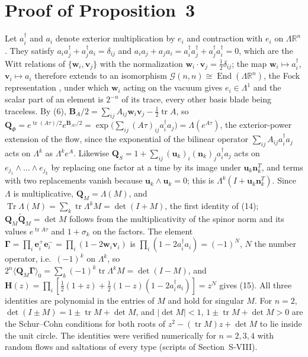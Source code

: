 \documentclass[journal]{IEEEtran}
\newcommand{\Gnn}{\mathcal{G}(n,n)}
\newcommand{\rev}[1]{\widetilde{#1}}
\begin{document}
\section{Proof of Proposition~3}
Let $a_i^{\dagger}$ and $a_i$ denote exterior multiplication by $e_i$ and
contraction with $e_i$ on $\Lambda\mathbb{R}^{n}$. They satisfy
$a_ia_j^{\dagger}+a_j^{\dagger}a_i=\delta_{ij}$ and
$a_ia_j+a_ja_i=a_i^{\dagger}a_j^{\dagger}+a_j^{\dagger}a_i^{\dagger}=0$, which
are the Witt relations of $\{\bm{w}_i,\bm{v}_j\}$ with the normalization
$\bm{w}_i\!\cdot\!\bm{v}_j=\tfrac12\delta_{ij}$; the map
$\bm{w}_i\mapsto a_i^{\dagger}$, $\bm{v}_i\mapsto a_i$ therefore extends to
an isomorphism $\Gnn\cong\operatorname{End}(\Lambda\mathbb{R}^{n})$, the Fock
representation \cite{lounesto2001}, under which $\bm{w}_i$ acting on the
vacuum gives $e_i\in\Lambda^{1}$ and the scalar part of an element is
$2^{-n}$ of its trace, every other basis blade being traceless. By (6),
$\bm{B}_A/2=\sum_{ij}A_{ij}\bm{w}_i\bm{v}_j-\tfrac12\operatorname{tr}A$, so
$\bm{Q}_{\Phi}=e^{\operatorname{tr}(A\tau)/2}e^{\bm{B}_{A\tau}/2}
=\exp\bigl(\sum_{ij}(A\tau)_{ij}a_i^{\dagger}a_j\bigr)=\Lambda(e^{A\tau})$,
the exterior-power extension of the flow, since the exponential of the
bilinear operator $\sum_{ij}A_{ij}a_i^{\dagger}a_j$ acts on $\Lambda^{k}$ as
$\Lambda^{k}e^{A}$. Likewise
$\bm{Q}_S=1+\sum_{ij}(\bm{u}_k)_i(\bm{n}_k)_j a_i^{\dagger}a_j$ acts on
$e_{j_1}\wedge\dots\wedge e_{j_k}$ by replacing one factor at a time by its
image under $\bm{u}_k\bm{n}_k^{T}$, and terms with two replacements vanish
because $\bm{u}_k\wedge\bm{u}_k=0$; this is $\Lambda^{k}(I+\bm{u}_k\bm{n}_k^{T})$.
Since $\Lambda$ is multiplicative, $\bm{Q}_M=\Lambda(M)$, and
$\operatorname{Tr}\Lambda(M)=\sum_k\operatorname{tr}\Lambda^{k}M=\det(I+M)$, the first identity of (14);
$\bm{Q}_M\rev{\bm{Q}}_M=\det M$ follows from the multiplicativity of the
spinor norm and its values $e^{\operatorname{tr}A\tau}$ and $1+\sigma_k$ on
the factors. The element
$\bm{\Gamma}=\prod_i\bm{e}^{+}_i\bm{e}^{-}_i=\prod_i(1-2\bm{w}_i\bm{v}_i)$ is
$\prod_i(1-2a_i^{\dagger}a_i)=(-1)^{N}$, $N$ the number operator, i.e.\
$(-1)^{k}$ on $\Lambda^{k}$, so
$2^{n}\langle\bm{Q}_M\bm{\Gamma}\rangle_0=\sum_k(-1)^{k}\operatorname{tr}\Lambda^{k}M
=\det(I-M)$, and $\bm{H}(z)=\prod_i[\tfrac12(1+z)+\tfrac12(1-z)(1-2a_i^{\dagger}a_i)]
=z^{N}$ gives (15). All three identities are polynomial in the
entries of $M$ and hold for singular $M$. For $n=2$, $\det(I\pm M)=1\pm\operatorname{tr}M+\det M$,
and $\lvert\det M\rvert<1$, $1\pm\operatorname{tr}M+\det M>0$ are the
Schur--Cohn conditions for both roots of $z^2-(\operatorname{tr}M)z+\det M$
to lie inside the unit circle. The identities were verified numerically for
$n=2,3,4$ with random flows and saltations of every type (scripts of Section~S-VIII).
\end{document}
